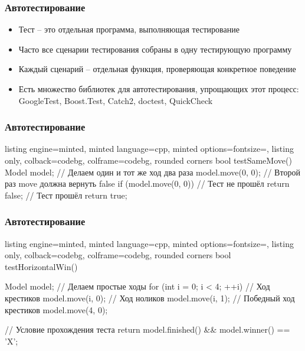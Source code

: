 \documentclass[10pt]{beamer}
\begin{document}
\begin{frame}[fragile]
\frametitle{Автотестирование}
\begin{itemize}
\item Тест -- это отдельная программа, выполняющая тестирование
\pause
\item Часто все сценарии тестирования собраны в одну тестирующую программу
\pause
\item Каждый сценарий -- отдельная функция, проверяющая конкретное поведение
\pause
\item Есть множество библиотек для автотестирования, упрощающих этот процесс: GoogleTest, Boost.Test, Catch2, doctest, QuickCheck
\end{itemize}
\end{frame}

\begin{frame}[fragile]
\frametitle{Автотестирование}
\begin{itemize}
\begin{tcblisting}{listing engine=minted, minted language=cpp, minted options={fontsize=\scriptsize}, listing only, colback=codebg, colframe=codebg, rounded corners}
bool testSameMove() {
  Model model;
  // Делаем один и тот же ход два раза
  model.move(0, 0);
  // Второй раз move должна вернуть false
  if (model.move(0, 0)) {
    // Тест не прошёл
    return false;
  }
  // Тест прошёл
  return true;
}
\end{tcblisting}
\end{itemize}
\end{frame}

\begin{frame}[fragile]
\frametitle{Автотестирование}
\begin{itemize}
\begin{tcblisting}{listing engine=minted, minted language=cpp, minted options={fontsize=\scriptsize}, listing only, colback=codebg, colframe=codebg, rounded corners}
bool testHorizontalWin() {
  Model model;
  // Делаем простые ходы
  for (int i = 0; i < 4; ++i) {
    // Ход крестиков
    model.move(i, 0);
    // Ход ноликов
    model.move(i, 1);
  }
  // Победный ход крестиков
  model.move(4, 0);

  // Условие прохождения теста
  return model.finished() && model.winner() == 'X';
}
\end{tcblisting}
\end{itemize}
\end{frame}
\end{document}
